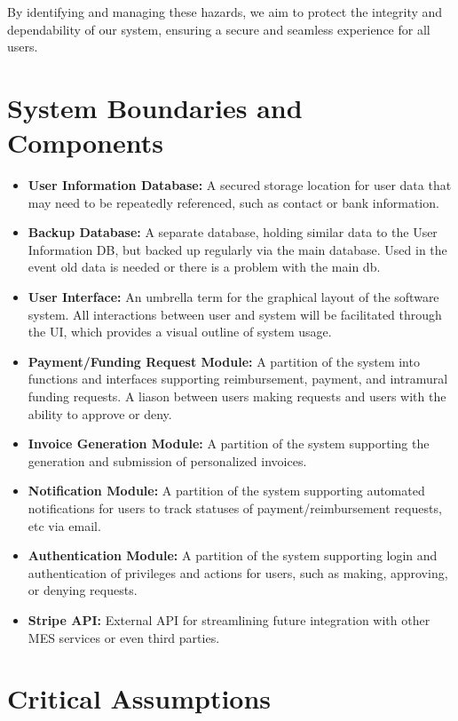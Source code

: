 \documentclass{article}
\begin{document}
By identifying and managing these hazards, we aim to protect the integrity and dependability of our system, ensuring a secure and seamless experience for all users.


\section{System Boundaries and Components}

\begin{itemize}
  \item \textbf{User Information Database:} A secured storage location for user data that may need to be repeatedly referenced, such as contact or bank information.
  \item \textbf{Backup Database:} A separate database, holding similar data to the User Information DB, but backed up regularly via the main database. Used in the event old data is needed or there is a problem with the main db.
  \item \textbf{User Interface:} An umbrella term for the graphical layout of the software system. All interactions between user and system will be facilitated through the UI, which provides a visual outline of system usage.
  \item \textbf{Payment/Funding Request Module:} A partition of the system into functions and interfaces supporting reimbursement, payment, and intramural funding requests. A liason between users making requests and users with the ability to approve or deny.
  \item \textbf{Invoice Generation Module:} A partition of the system supporting the generation and submission of personalized invoices.
  \item \textbf{Notification Module:} A partition of the system supporting automated notifications for users to track statuses of payment/reimbursement requests, etc via email.
  \item \textbf{Authentication Module:} A partition of the system supporting login and authentication of privileges and actions for users, such as making, approving, or denying requests.
  \item \textbf{Stripe API:} External API for streamlining future integration with other MES services or even third parties.
\end{itemize}

\section{Critical Assumptions}
\end{document}
